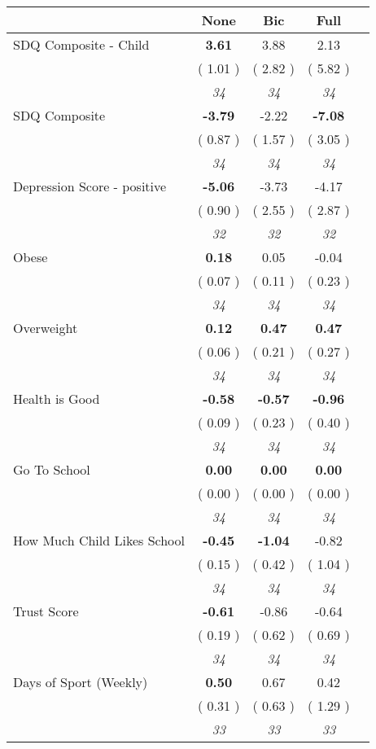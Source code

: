 \begin{tabular}{l c c c c}
\toprule
 & None & Bic & Full \\
\midrule
SDQ Composite - Child & \textbf{      3.61 } &      3.88 &      2.13 \\
& (     1.01 ) & (     2.82 ) & (     5.82 ) \\
& \textit{ 34 } & \textit{ 34 } & \textit{ 34 } \\
SDQ Composite & \textbf{     -3.79 } &     -2.22 & \textbf{     -7.08 } \\
& (     0.87 ) & (     1.57 ) & (     3.05 ) \\
& \textit{ 34 } & \textit{ 34 } & \textit{ 34 } \\
Depression Score - positive & \textbf{     -5.06 } &     -3.73 &     -4.17 \\
& (     0.90 ) & (     2.55 ) & (     2.87 ) \\
& \textit{ 32 } & \textit{ 32 } & \textit{ 32 } \\
Obese & \textbf{      0.18 } &      0.05 &     -0.04 \\
& (     0.07 ) & (     0.11 ) & (     0.23 ) \\
& \textit{ 34 } & \textit{ 34 } & \textit{ 34 } \\
Overweight & \textbf{      0.12 } & \textbf{      0.47 } & \textbf{      0.47 } \\
& (     0.06 ) & (     0.21 ) & (     0.27 ) \\
& \textit{ 34 } & \textit{ 34 } & \textit{ 34 } \\
Health is Good & \textbf{     -0.58 } & \textbf{     -0.57 } & \textbf{     -0.96 } \\
& (     0.09 ) & (     0.23 ) & (     0.40 ) \\
& \textit{ 34 } & \textit{ 34 } & \textit{ 34 } \\
Go To School & \textbf{      0.00 } & \textbf{      0.00 } & \textbf{      0.00 } \\
& (     0.00 ) & (     0.00 ) & (     0.00 ) \\
& \textit{ 34 } & \textit{ 34 } & \textit{ 34 } \\
How Much Child Likes School & \textbf{     -0.45 } & \textbf{     -1.04 } &     -0.82 \\
& (     0.15 ) & (     0.42 ) & (     1.04 ) \\
& \textit{ 34 } & \textit{ 34 } & \textit{ 34 } \\
Trust Score & \textbf{     -0.61 } &     -0.86 &     -0.64 \\
& (     0.19 ) & (     0.62 ) & (     0.69 ) \\
& \textit{ 34 } & \textit{ 34 } & \textit{ 34 } \\
Days of Sport (Weekly) & \textbf{      0.50 } &      0.67 &      0.42 \\
& (     0.31 ) & (     0.63 ) & (     1.29 ) \\
& \textit{ 33 } & \textit{ 33 } & \textit{ 33 } \\
\bottomrule
\end{tabular}
